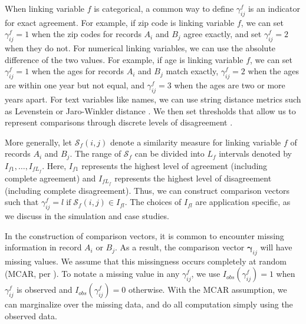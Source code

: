\documentclass[ba]{imsart}
\begin{document}
When linking variable $f$ is categorical, a common way to define $\gamma_{ij}^f$ is an indicator for exact agreement. For example, if zip code is linking variable $f$, we can set $\gamma_{ij}^f=1$ when the zip codes for records $A_i$ and $B_j$ agree exactly, and set $\gamma_{ij}^f=2$ when they do not. For numerical linking variables, we can use the absolute difference of the two values. For example, if age is linking variable $f$, we can set $\gamma_{ij}^f = 1$ when the ages for records $A_i$ and $B_j$ match exactly, $\gamma_{ij}^f = 2$ when the ages are within one year but not equal, and $\gamma_{ij}^f = 3$ when the ages are two or more years apart. For text variables like names, we can use string distance metrics such as Levenstein or Jaro-Winkler distance \citep{cohen2003comparison}. We then set thresholds that allow us to represent comparisons through discrete levels of disagreement \citep{bilenko2006riddle, elmagarmid_duplicate_2007}.

More generally, let $\mathcal{S}_f(i,j)$ denote a similarity measure for linking variable $f$ of records $A_i$ and $B_j.$ The range of $\mathcal{S}_f$ can be divided into $L_f$ intervals denoted by $I_{f1}, \ldots, I_{fL_f}$. Here, $I_{f1}$ represents the highest level of agreement (including complete agreement) and $I_{fL_f}$ represents the highest level of disagreement (including complete disagreement). Thus, we can construct comparison vectors such that $\gamma_{ij}^f = l \; \text{if} \; \mathcal{S}_f(i,j) \in I_{fl}.$ The choices of $I_{fl}$ are application specific, as we discuss in the simulation and case studies.

In the construction of comparison vectors, it is common to encounter missing information in record $A_i$ or $B_j$. As a result, the comparison vector $\mathbf{\gamma}_{ij}$ will have missing values. We assume that this missingness occurs completely at random (MCAR, per \cite{LittleRubin2002}). To notate a missing value in any $\gamma_{ij}^f$, we use $I_{obs}(\gamma_{ij}^f)=1$ when $\gamma_{ij}^f$ is observed and $I_{obs}(\gamma_{ij}^f)=0$ otherwise. With the MCAR assumption, we can marginalize over the missing data, and do all computation simply using the observed data.

\end{document}
